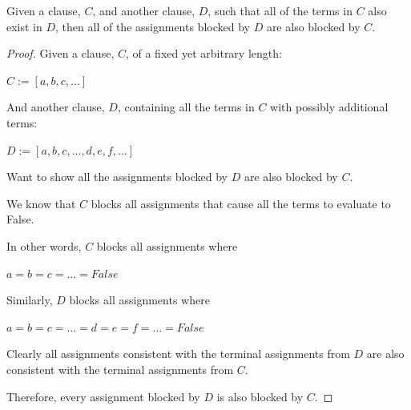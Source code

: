 \documentclass[manuscript]{acmart}
\begin{document}
    \begin{lemma}
        Given a clause, $C$, and another clause, $D$, such that all of the terms in $C$ also exist in $D$, then all of the assignments blocked by $D$ are also blocked by $C$.
    \end{lemma}
    \begin{proof}
        Given a clause, $C$, of a fixed yet arbitrary length:

        $C := [a, b, c, ...]$

        And another clause, $D$, containing all the terms in $C$ with possibly additional terms:

        $D := [a, b, c, ..., d, e, f, ...]$

        Want to show all the assignments blocked by $D$ are also blocked by $C$.

        We know that $C$ blocks all assignments that cause all the terms to evaluate to False.

        In other words, $C$ blocks all assignments where 
 
        $a = b = c = ... = False$

        Similarly, $D$ blocks all assignments where

        $a = b = c = ... = d = e = f = ... = False$

        Clearly all assignments consistent with the terminal assignments from $D$ are also consistent with the terminal assignments from $C$.

        Therefore, every assignment blocked by $D$ is also blocked by $C$.
    \end{proof}
\end{document}
